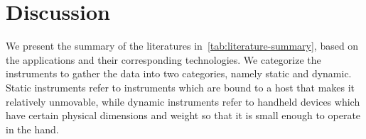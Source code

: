  






\section{Discussion} %
\label{sec:literature-discussion}
	We present the summary of the literatures in~\autoref{tab:literature-summary}, based on the applications and their corresponding technologies. We categorize the instruments to gather the data into two categories, namely static and dynamic. Static instruments refer to instruments which are bound to a host that makes it relatively unmovable, while dynamic instruments refer to handheld devices which have certain physical dimensions and weight so that it is small enough to operate in the hand.

